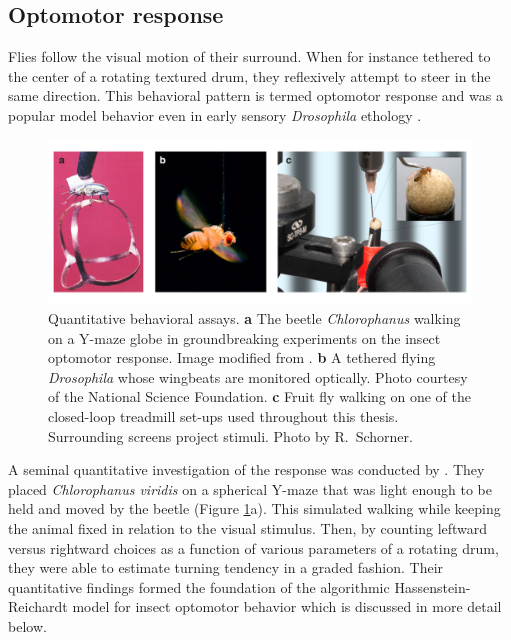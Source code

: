 \subsection{Optomotor response}
Flies follow the visual motion of their surround. When for instance tethered to the center of a rotating textured drum, they reflexively attempt to steer in the same direction. This behavioral pattern is termed optomotor response and was a popular model behavior even in early sensory \textit{Drosophila} ethology \citep{Hecht:1934aa,Kalmus:1943aa}.

\begin{figure}
    \centering
    \includegraphics[width=1\textwidth]{graphics/figure_setups}
    \caption[Behavioral set-ups for sensory neuroscience]
    {Quantitative behavioral assays. \textbf{a} The beetle \textit{Chlorophanus} walking on a Y-maze globe in groundbreaking experiments on the insect optomotor response. Image modified from \citet{Hassenstein:1991aa}. \textbf{b} A tethered flying \textit{Drosophila} whose wingbeats are monitored optically. Photo courtesy of the National Science Foundation. \textbf{c} Fruit fly walking on one of the closed-loop treadmill set-ups used throughout this thesis. Surrounding screens project stimuli. Photo by R.\ Schorner.}
    \label{fig:setups}
\end{figure}

A seminal quantitative investigation of the response was conducted by \citet{Hassenstein:1956fa}. They placed \textit{Chlorophanus viridis} on a spherical Y-maze that was light enough to be held and moved by the beetle (Figure \ref{fig:setups}a). This simulated walking while keeping the animal fixed in relation to the visual stimulus. Then, by counting leftward versus rightward choices as a function of various parameters of a rotating drum, they were able to estimate turning tendency in a graded fashion. Their quantitative findings formed the foundation of the algorithmic Hassenstein-Reichardt model for insect optomotor behavior \citep{Reichardt:1961aa} which is discussed in more detail below.

